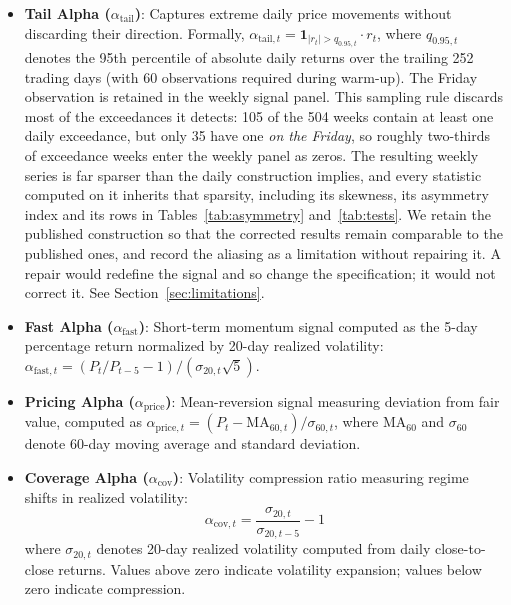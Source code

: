 \documentclass[11pt]{article}
\begin{document}
\begin{itemize}
    \item \textbf{Tail Alpha ($\alpha_{\text{tail}}$)}: Captures extreme daily price movements without discarding their direction. Formally, $\alpha_{\text{tail},t} = \mathbf{1}_{|r_t| > q_{0.95,t}} \cdot r_t$, where $q_{0.95,t}$ denotes the 95th percentile of absolute daily returns over the trailing 252 trading days (with 60 observations required during warm-up). The Friday observation is retained in the weekly signal panel. This sampling rule discards most of the exceedances it detects: 105 of the 504 weeks contain at least one daily exceedance, but only 35 have one \emph{on the Friday}, so roughly two-thirds of exceedance weeks enter the weekly panel as zeros. The resulting weekly series is far sparser than the daily construction implies, and every statistic computed on it inherits that sparsity, including its skewness, its asymmetry index and its rows in Tables~\ref{tab:asymmetry} and~\ref{tab:tests}. We retain the published construction so that the corrected results remain comparable to the published ones, and record the aliasing as a limitation without repairing it. A repair would redefine the signal and so change the specification; it would not correct it. See Section~\ref{sec:limitations}.

    \item \textbf{Fast Alpha ($\alpha_{\text{fast}}$)}: Short-term momentum signal computed as the 5-day percentage return normalized by 20-day realized volatility: $\alpha_{\text{fast},t} = (P_t/P_{t-5} - 1) / (\sigma_{20,t} \sqrt{5})$.

    \item \textbf{Pricing Alpha ($\alpha_{\text{price}}$)}: Mean-reversion signal measuring deviation from fair value, computed as $\alpha_{\text{price},t} = (P_t - \text{MA}_{60,t}) / \sigma_{60,t}$, where $\text{MA}_{60}$ and $\sigma_{60}$ denote 60-day moving average and standard deviation.

    \item \textbf{Coverage Alpha ($\alpha_{\text{cov}}$)}: Volatility compression ratio measuring regime shifts in realized volatility:
    \begin{equation}
        \alpha_{\text{cov},t} = \frac{\sigma_{20,t}}{\sigma_{20,t-5}} - 1
    \end{equation}
    where $\sigma_{20,t}$ denotes 20-day realized volatility computed from daily close-to-close returns. Values above zero indicate volatility expansion; values below zero indicate compression.


\end{itemize}
\end{document}
